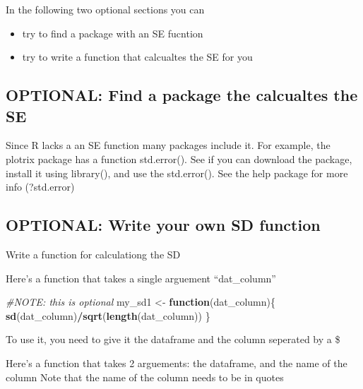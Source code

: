 \documentclass[]{book}
\newenvironment{Shaded}{\begin{snugshade}}{\end{snugshade}}
\newcommand{\KeywordTok}[1]{\textcolor[rgb]{0.13,0.29,0.53}{\textbf{#1}}}
\newcommand{\StringTok}[1]{\textcolor[rgb]{0.31,0.60,0.02}{#1}}
\newcommand{\CommentTok}[1]{\textcolor[rgb]{0.56,0.35,0.01}{\textit{#1}}}
\newcommand{\ControlFlowTok}[1]{\textcolor[rgb]{0.13,0.29,0.53}{\textbf{#1}}}
\newcommand{\OperatorTok}[1]{\textcolor[rgb]{0.81,0.36,0.00}{\textbf{#1}}}
\newcommand{\NormalTok}[1]{#1}
\providecommand{\tightlist}{%
  \setlength{\itemsep}{0pt}\setlength{\parskip}{0pt}}
\theoremstyle{definition}
\theoremstyle{definition}
\theoremstyle{definition}
\theoremstyle{remark}
\begin{document}
In the following two optional sections you can

\begin{itemize}
\tightlist
\item
  try to find a package with an SE fucntion
\item
  try to write a function that calcualtes the SE for you
\end{itemize}

\subsection{OPTIONAL: Find a package the calcualtes the
SE}\label{optional-find-a-package-the-calcualtes-the-se}

Since R lacks a an SE function many packages include it. For example,
the plotrix package has a function std.error(). See if you can download
the package, install it using library(), and use the std.error(). See
the help package for more info (?std.error)

\subsection{OPTIONAL: Write your own SD
function}\label{optional-write-your-own-sd-function}

Write a function for calculationg the SD

Here's a function that takes a single arguement ``dat\_column''

\begin{Shaded}
\begin{Highlighting}[]
\CommentTok{#NOTE: this is optional}
\NormalTok{my_sd1 <-}\StringTok{ }\ControlFlowTok{function}\NormalTok{(dat_column)\{}
  \KeywordTok{sd}\NormalTok{(dat_column)}\OperatorTok{/}\KeywordTok{sqrt}\NormalTok{(}\KeywordTok{length}\NormalTok{(dat_column))}
\NormalTok{\}}
\end{Highlighting}
\end{Shaded}

To use it, you need to give it the dataframe and the column seperated by
a \$

\begin{Shaded}
\end{Shaded}

Here's a function that takes 2 arguements: the dataframe, and the name
of the column Note that the name of the column needs to be in quotes
\end{document}
